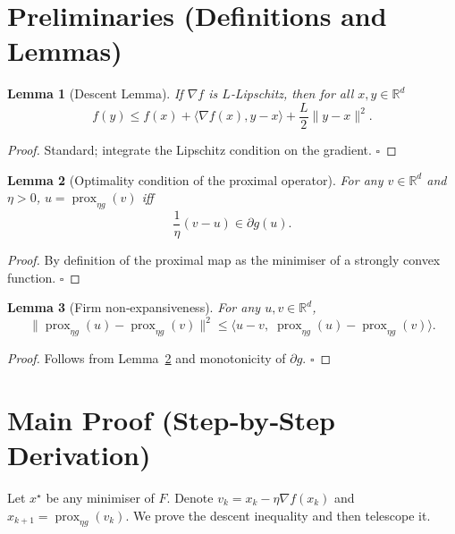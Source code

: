 \documentclass{article}
\newtheorem{lemma}{Lemma}
\newcommand{\prox}{\operatorname{prox}}
\newcommand{\grad}{\nabla}
\newcommand{\R}{\mathbb{R}}
\begin{document}
\newpage
\section*{Preliminaries (Definitions and Lemmas)}
\begin{lemma}[Descent Lemma]\label{lem:descent}
If $\grad f$ is $L$‑Lipschitz, then for all $x,y\in\R^{d}$
\[
f(y)\le f(x)+\langle\grad f(x),y-x\rangle+\frac{L}{2}\|y-x\|^{2}.
\tag{L1}
\]
\end{lemma}
\begin{proof}
Standard; integrate the Lipschitz condition on the gradient. \hfill $\square$
\end{proof}

\begin{lemma}[Optimality condition of the proximal operator]\label{lem:prox_opt}
For any $v\in\R^{d}$ and $\eta>0$, $u=\prox_{\eta g}(v)$ iff
\[
\frac{1}{\eta}(v-u)\in\partial g(u).
\tag{L2}
\]
\end{lemma}
\begin{proof}
By definition of the proximal map as the minimiser of a strongly convex function. \hfill $\square$
\end{proof}

\begin{lemma}[Firm non‑expansiveness]\label{lem:firm}
For any $u,v\in\R^{d}$,
\[
\|\prox_{\eta g}(u)-\prox_{\eta g}(v)\|^{2}
\le\langle u-v,\;\prox_{\eta g}(u)-\prox_{\eta g}(v)\rangle .
\tag{L3}
\]
\end{lemma}
\begin{proof}
Follows from Lemma~\ref{lem:prox_opt} and monotonicity of $\partial g$. \hfill $\square$
\end{proof}

\section*{Main Proof (Step‑by‑Step Derivation)}
Let $x^{\star}$ be any minimiser of $F$. Denote $v_{k}=x_{k}-\eta\grad f(x_{k})$ and $x_{k+1}= \prox_{\eta g}(v_{k})$.
We prove the descent inequality and then telescope it.
\end{document}
